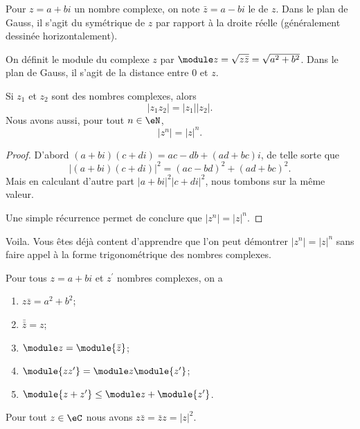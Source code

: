 Pour $z = a + bi$ un nombre complexe, on note $\bar z = a - bi$ le
 de $z$. Dans le plan de Gauss, il s'agit du
symétrique de $z$ par rapport à la droite réelle (généralement
dessinée horizontalement).

On définit le module du complexe $z$ par $\module z = \sqrt{z\bar z} =
\sqrt{a^2 + b^2}$. Dans le plan de Gauss, il s'agit de la distance
entre $0$ et $z$.

\begin{proposition} \label{PROPooXLARooYSDCsF}
 Si \( z_1\) et \( z_2\) sont des nombres complexes, alors 
 \begin{equation}
     | z_1z_2 |=| z_1 | |z_2 |.
 \end{equation}
 Nous avons aussi, pour tout \( n\in \eN\),
 \begin{equation}
     | z^n |=| z |^n.
 \end{equation}
\end{proposition}

\begin{proof}
    D'abord \( (a+bi)(c+di)=ac-db+(ad+bc)i\), de telle sorte que
    \begin{equation}
        | (a+bi)(c+di) |^2=(ac-bd)^2+(ad+bc)^2.
    \end{equation}
    Mais en calculant d'autre part \( | a+bi |^2| c+di |^2\), nous tombons sur la même valeur.

    Une simple récurrence permet de conclure que \( | z^n |=| z |^n\).
\end{proof}
Voila. Vous êtes déjà content d'apprendre que l'on peut démontrer \( | z^n |=| z |^n\) sans faire appel à la forme trigonométrique des nombres complexes.


\begin{proposition}
Pour tous $z = a+bi$ et $z^\prime$ nombres complexes, on a
   \begin{enumerate}
   \item $z \bar z = a^2 + b^2$;
   \item $\bar{\bar{z}} = z$;
   \item $\module z = \module {\bar z}$;
   \item $\module{zz^\prime} = \module z \module{z^\prime}$;
   \item $\module{z+z^\prime} \leq \module z + \module{z^\prime}$.
   \end{enumerate}
\end{proposition}

\begin{lemma}   \label{LEMooONLNooXLNbtB}
    Pour tout \( z\in \eC\) nous avons \( z\bar z=\bar z z=| z |^2\).
\end{lemma}
